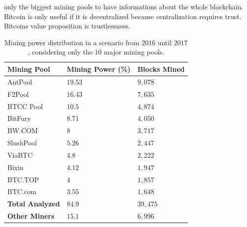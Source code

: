 \documentclass[USenglish]{uit-thesis}
\begin{document}
only the biggest mining pools to have informations
about the whole blockchain. Bitcoin is only useful if it is decentralized because
centralization requires trust. Bitcoins value proposition is trustlessness.
\begin{table}
	\centering
	\caption{Mining power distribution in a scenario from $2016$ until $2017$,
		considering only the $10$ major mining pools.}
	\label{tab:miner_share_2017}
	\begin{tabular}{|p{3.3cm}|p{3.3cm}|p{3.3cm}|} \hline
		\textbf{Mining Pool}&\textbf{Mining Power (\%)}& \textbf{Blocks Mined}\\
		\hline
		\rowcolor{AntPool}
		AntPool&$19.53$&$9,078$\\
		\hline
		\rowcolor{F2Pool}
		F2Pool&$16.43$&$7,635$\\
		\hline
		\rowcolor{BTCC Pool}
		BTCC Pool&$10.5$&$4,874$\\
		\hline
		\rowcolor{BitFury}
		BitFury&$8.71$&$4,050$\\
		\hline
		\rowcolor{BW.COM}
		BW.COM&$8$&$3,717$\\
		\hline
		\rowcolor{SlushPool}
		SlushPool&$5.26$&$2,447$\\
		\hline
		ViaBTC&$4.8$&$2,222$\\
		\hline
		Bixin&$4.12$&$1,947$\\
		\hline
		BTC.TOP&$4$&$1,857$\\
		\hline
		BTC.com&$3.55$&$1,648$\\
		\hline
		\rowcolor{TablesColor}
		\textbf{Total Analyzed}&$84.9$&$39,475$\\
		\hline
		\textbf{Other Miners}&$15.1$&$6,996$\\
		\hline
	\end{tabular}
\end{table}
\end{document}
